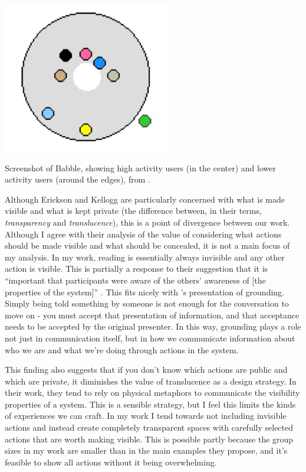 \documentclass{tufte-handout}
\begin{document}
\begin{marginfigure}
	\includegraphics{figures/babble.png}
	\caption{Screenshot of Babble, showing high activity users (in the center) and lower activity users (around the edges), from \citep{Erickson:2003td}.}
	\label{fig:proxy-babble}
\end{marginfigure}

Although Erickson and Kellogg are particularly concerned with what is made visible and what is kept private (the difference between, in their terms, \emph{transparency} and \emph{translucence}), this is a point of divergence between our work. Although I agree with their analysis of the value of considering what actions should be made visible and what should be concealed, it is not a main focus of my analysis. In my work, reading is essentially always invisible and any other action is visible. This is partially a response to their suggestion that it is ``important that participants were aware of the others' awareness of [the properties of the system]'' \citep{Erickson:2003td}. This fits nicely with \citet{Brennan:1991wk}'s presentation of grounding. Simply being told something by someone is not enough for the conversation to move on - you must accept that presentation of information, and that acceptance needs to be accepted by the original presenter. In this way, grounding plays a role not just in communication itself, but in how we communicate information about who we are and what we're doing through actions in the system. 

This finding also suggests that if you don't know which actions are public and which are private, it diminishes the value of translucence as a design strategy. In their work, they tend to rely on physical metaphors to communicate the visibility properties of a system. This is a sensible strategy, but I feel this limits the kinds of experiences we can craft. In my work I tend towards not including invisible actions and instead create completely transparent spaces with carefully selected actions that are worth making visible. This is possible partly because the group sizes in my work are smaller than in the main examples they propose, and it's feasible to show all actions without it being overwhelming. 
\end{document}
